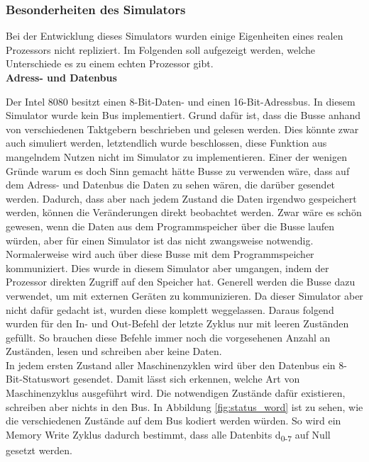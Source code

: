 \documentclass[12pt]{article}
\begin{document}
\subsubsection{Besonderheiten des Simulators}
Bei der Entwicklung dieses Simulators wurden einige Eigenheiten eines realen Prozessors nicht repliziert. Im Folgenden soll aufgezeigt werden, welche Unterschiede es zu einem echten Prozessor gibt.
\\

\noindent
\textbf{Adress- und Datenbus}

\noindent
Der Intel 8080 besitzt einen 8-Bit-Daten- und einen 16-Bit-Adressbus. 
In diesem Simulator wurde kein Bus implementiert. Grund dafür ist, dass die Busse anhand von verschiedenen Taktgebern beschrieben und gelesen werden. Dies könnte zwar auch simuliert werden, letztendlich wurde beschlossen, diese Funktion aus mangelndem Nutzen nicht im Simulator zu implementieren. Einer der wenigen Gründe warum es doch Sinn gemacht hätte Busse zu verwenden wäre, dass auf dem Adress- und Datenbus die Daten zu sehen wären, die darüber gesendet werden. Dadurch, dass aber nach jedem Zustand die Daten irgendwo gespeichert werden, können die Veränderungen direkt beobachtet werden. Zwar wäre es schön gewesen, wenn die Daten aus dem Programmspeicher über die Busse laufen würden, aber für einen Simulator ist das nicht zwangsweise notwendig. Normalerweise wird auch über diese Busse mit dem Programmspeicher kommuniziert. Dies wurde in diesem Simulator aber umgangen, indem der Prozessor direkten Zugriff auf den Speicher hat. Generell werden die Busse dazu verwendet, um mit externen Geräten zu kommunizieren. Da dieser Simulator aber nicht dafür gedacht ist, wurden diese komplett weggelassen. Daraus folgend wurden für den In- und Out-Befehl der letzte Zyklus nur mit leeren Zuständen gefüllt. So brauchen diese Befehle immer noch die vorgesehenen Anzahl an Zuständen, lesen und schreiben aber keine Daten.
\\

\noindent
In jedem ersten Zustand aller Maschinenzyklen wird über den Datenbus ein 8-Bit-Statuswort gesendet. Damit lässt sich erkennen, welche Art von Maschinenzyklus ausgeführt wird.
Die notwendigen Zustände dafür existieren, schreiben aber nichts in den Bus. In Abbildung \ref{fig:status_word} ist zu sehen, wie die verschiedenen Zustände auf dem Bus kodiert werden würden. So wird ein Memory Write Zyklus dadurch bestimmt, dass alle Datenbits d\textsubscript{0-7} auf Null gesetzt werden.
\end{document}
